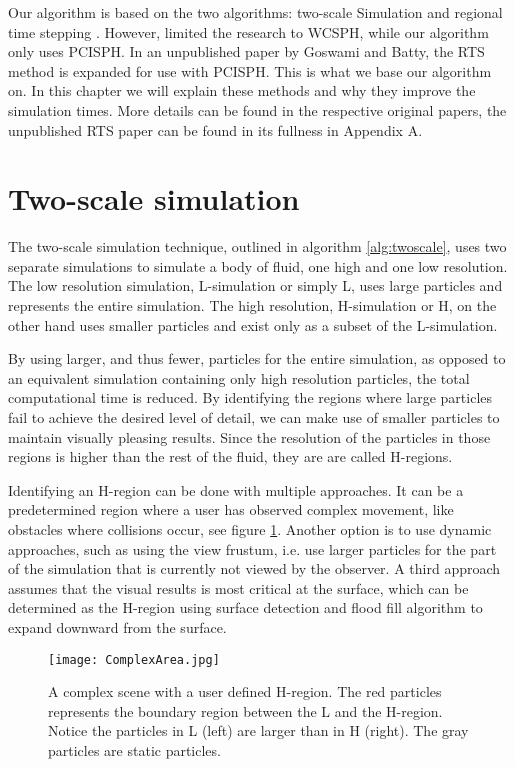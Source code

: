 \documentclass[../../main.tex]{subfiles}
\begin{document}
\tracingall

Our algorithm is based on the two algorithms: two-scale Simulation \citep{solenthaler2011two} and regional time stepping \citep{goswami2014regional}. However, \citet{goswami2014regional} limited the research to WCSPH, while our algorithm only uses PCISPH. In an unpublished paper by Goswami and Batty, the RTS method is expanded for use with PCISPH. This is what we base our algorithm on. In this chapter we will explain these methods and why they improve the simulation times. More details can be found in the respective original papers, the unpublished RTS paper can be found in its fullness in Appendix A.

\section{Two-scale simulation}
\label{sec:twoscale}
The two-scale simulation technique, outlined in algorithm \ref{alg:twoscale}, uses two separate simulations to simulate a body of fluid, one high and one low resolution. The low resolution simulation, L-simulation or simply L, uses large particles and represents the entire simulation. The high resolution, H-simulation or H, on the other hand uses smaller particles and exist only as a subset of the L-simulation. 

By using larger, and thus fewer, particles for the entire simulation, as opposed to an equivalent simulation containing only high resolution particles, the total computational time is reduced. By identifying the regions where large particles fail to achieve the desired level of detail, we can make use of smaller particles to maintain visually pleasing results. Since the resolution of the particles in those regions is higher than the rest of the fluid, they are are called H-regions.

Identifying an H-region can be done with multiple approaches. It can be a predetermined region where a user has observed complex movement, like obstacles where collisions occur, see figure \ref{fig:complexarea}. Another option is to use dynamic approaches, such as using the view frustum, i.e. use larger particles for the part of the simulation that is currently not viewed by the observer. A third approach assumes that the visual results is most critical at the surface, which can be determined as the H-region using surface detection \citep{solenthaler2007efficient} and flood fill algorithm to expand downward from the surface.

\begin{figure}[h!]
    \centering
    \texttt{[image: ComplexArea.jpg]}
    \caption[Complex scene with user defined H-region]{A complex scene with a user defined H-region. The red particles represents the boundary region between the L and the H-region. Notice the particles in L (left) are larger than in H (right). The gray particles are static particles.
    }
    \label{fig:complexarea}
\end{figure}
\end{document}
